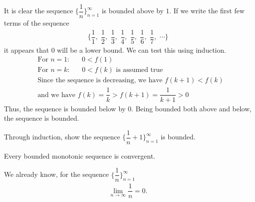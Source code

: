 \begin{example}
It is clear the sequence $\Big\{\dfrac{1}{n}\Big\}_{n=1}^{\infty}$ is bounded above by $1$. If we write the first few terms of the sequence
\begin{align*}
    \Big\{\dfrac{1}{1}, \hspace{4pt} \dfrac{1}{2}, \hspace{4pt} \dfrac{1}{3}, \hspace{4pt} \dfrac{1}{4}, \hspace{4pt} \dfrac{1}{5}, \hspace{4pt} \dfrac{1}{6}, \hspace{4pt} \dfrac{1}{7}, \hspace{4pt} \cdots \Big\}
\end{align*}
it appears that $0$ will be a lower bound. We can test this using induction.
\begin{align*}
    &\text{For} \hspace{4pt} n=1: \hspace{20pt} 0 < f(1)\\[2ex]
    &\text{For} \hspace{4pt} n=k: \hspace{20pt} 0 < f(k) \hspace{4pt} \text{is assumed true}\\[2ex]
    &\text{Since the sequence is decreasing, we have} \hspace{4pt} f(k+1) < f(k)\\[2ex]
    &\text{and we have} \hspace{4pt} f(k) = \dfrac{1}{k} > f(k+1) = \dfrac{1}{k+1} > 0 
\end{align*}
Thus, the sequence is bounded below by $0$. Being bounded both above and below, the sequence is bounded.
\end{example}

\begin{exercise}
Through induction, show the sequence $\Big\{\dfrac{1}{n} + 1\Big\}_{n=1}^{\infty}$ is bounded.
\end{exercise}

\begin{theorem}
Every bounded monotonic sequence is convergent.
\label{monotone_bounded_convergent}
\end{theorem}

\begin{example}
We already know, for the sequence $\Big\{\dfrac{1}{n}\Big\}_{n=1}^{\infty}$
\begin{align*}
    \lim_{n \longrightarrow \infty} \dfrac{1}{n} = 0.
\end{align*}
\end{example}

